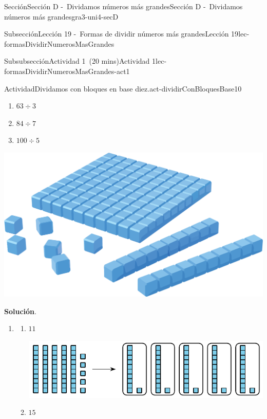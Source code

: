 \documentclass[oneside,10pt,]{article}
\newcommand{\blocktitlefont}{\relax}
\begin{document}
\begin{sectionptx}{Sección}{Sección D -~Dividamos números más grandes}{}{Sección D -~Dividamos números más grandes}{}{}{gra3-uni4-secD}
\begin{subsectionptx}{Subsección}{Lección 19 -~Formas de dividir números más grandes}{}{Lección 19}{}{}{lec-formasDividirNumerosMasGrandes}
\begin{subsubsectionptx}{Subsubsección}{Actividad 1~(20 mins)}{}{Actividad 1}{}{}{lec-formasDividirNumerosMasGrandes-act1}
\begin{activity}{Actividad}{Dividamos con bloques en base diez.}{act-dividirConBloquesBase10}
\begin{sidebyside}{2}{0}{0}{0.1}
\begin{sbspanel}{0.7}
\begin{enumerate}
%
\begin{enumerate}
\item{}\(\displaystyle 63 \div 3\)%
\item{}\(\displaystyle 84 \div 7\)%
\item{}\(\displaystyle 100 \div 5\)%
\end{enumerate}
\end{enumerate}
\end{sbspanel}%
\begin{sbspanel}{0.2}%
\includegraphics[width=\linewidth]{external/png-source/CS 3.4 Lesson 19 Activity 1.png}
\end{sbspanel}%
\end{sidebyside}%
\par\smallskip%
\noindent\textbf{\blocktitlefont Solución}.\hypertarget{act-dividirConBloquesBase10-3}{}\quad{}%
\begin{enumerate}
\item{}%
\begin{enumerate}
\item{}\(\displaystyle 11\)%
\begin{image}{0}{1}{0}{}%
\includegraphics[width=\linewidth]{external/svg-source/tikz-file-152965.pdf}
\end{image}%
\item{}\(\displaystyle 15\)%
\begin{image}{0}{1}{0}{}%

\end{image}
\end{enumerate}
\end{enumerate}
\end{activity}
\end{subsubsectionptx}
\end{subsectionptx}
\end{sectionptx}
\end{document}

